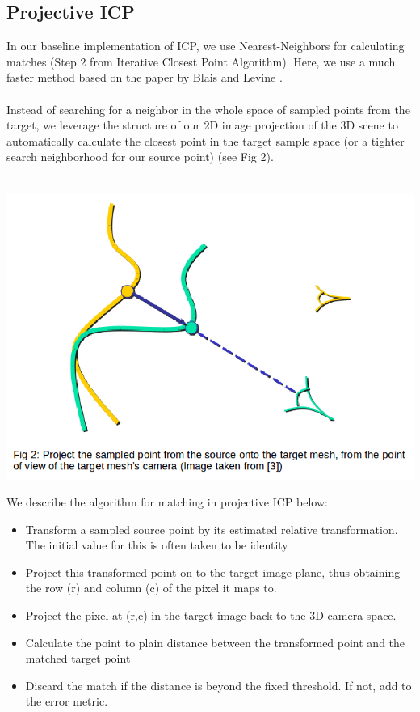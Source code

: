 \documentclass[a4paper,pagesize 10pt]{scrartcl}
\begin{document}
\subsection*{Projective ICP}
In our baseline implementation of ICP, we use Nearest-Neighbors for calculating matches (Step 2 from Iterative Closest Point Algorithm). Here, we use a much faster method based on the paper by Blais and Levine \cite{blaise}. \\\\
Instead of searching for a neighbor in the whole space of sampled points from the target, we leverage the structure of our 2D image projection of the 3D scene to automatically calculate the closest point in the target sample space (or a tighter search neighborhood for our source point) (see Fig 2). \\\\
\begin{center}
    \includegraphics[scale=0.5]{ProjectiveICP.png}
\end{center}
We describe the algorithm for matching in projective ICP below:
\begin{itemize}
    \item Transform a sampled source point by its estimated relative transformation. The initial value for this is often taken to be identity
    \item Project this transformed point on to the target image plane, thus obtaining the row (r) and column (c) of the pixel it maps to.
    \item Project the pixel at (r,c) in the target image back to the 3D camera space.
    \item Calculate the point to plain distance between the transformed point and the matched target point
    \item Discard the match if the distance is beyond the fixed threshold. If not, add to the error metric.
\end{itemize}
\end{document}
